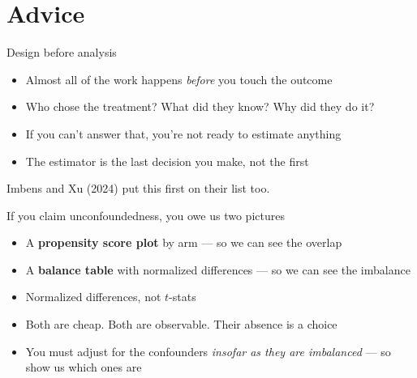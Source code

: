 \documentclass{beamer}
\newcommand{\highlight}[1]{\textcolor{accent}{\textbf{#1}}}
\newcommand{\deemph}[1]{\textcolor{warmgray}{\small #1}}
\begin{document}
\section{Advice}


\begin{frame}{Design before analysis}

\begin{itemize}
\item Almost all of the work happens \emph{before} you touch the outcome
\item Who chose the treatment? What did they know? Why did they do it?
\item If you can't answer that, you're not ready to estimate anything
\item The estimator is the last decision you make, not the first
\end{itemize}

\vspace{0.6em}

\deemph{Imbens and Xu (2024) put this first on their list too.}

\end{frame}


\begin{frame}{If you claim unconfoundedness, you owe us two pictures}

\begin{itemize}
\item A \highlight{propensity score plot} by arm --- so we can see the overlap
\item A \highlight{balance table} with normalized differences --- so we can see the imbalance
\end{itemize}

\vspace{0.8em}

\begin{itemize}
\item Normalized differences, not $t$-stats
\item Both are cheap. Both are observable. Their absence is a choice
\item You must adjust for the confounders \emph{insofar as they are imbalanced} --- so show us which ones are
\end{itemize}

\end{frame}
\end{document}
